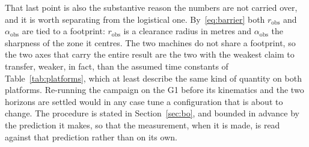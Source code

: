 \documentclass[11pt,a4paper]{article}
\newcommand{\aobs}{\alpha_{\mathrm{obs}}}
\newcommand{\robs}{r_{\mathrm{obs}}}
\begin{document}
That last point is also the substantive reason the numbers are not carried over, and it is worth separating
from the logistical one. By~\eqref{eq:barrier} both $\robs$ and $\aobs$ are tied to a footprint: $\robs$ is a
clearance radius in metres and $\aobs$ the sharpness of the zone it centres. The two machines do not share a
footprint, so the two axes that carry the entire result are the two with the weakest claim to transfer,
weaker, in fact, than the assumed time constants of Table~\ref{tab:platforms}, which at least describe the
same kind of quantity on both platforms. Re-running the campaign on the G1 before its kinematics and the two
horizons are settled would in any case tune a configuration that is about to change. The procedure is stated
in Section~\ref{sec:bo}, and bounded in advance by the prediction it makes, so that the measurement, when
it is made, is read against that prediction rather than on its own.


\end{document}
